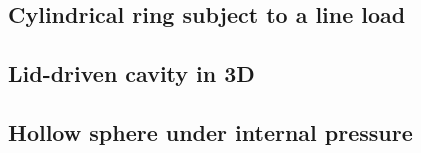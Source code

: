 \subsection{Cylindrical ring subject to a line load} \label{ss:ringlineload}


\subsection{Lid-driven cavity in 3D} \label{ss:liddriven3D}


\subsection{Hollow sphere under internal pressure} \label{ss:hollowsphereintpress}



